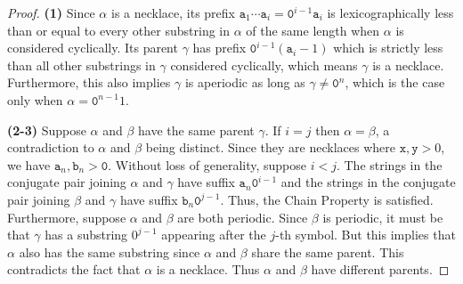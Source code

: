 \documentclass[10pt,a4paper]{amsart}
\renewcommand{\tt} {\mathtt}
\begin{document}
\begin{proof}
{\bf (1)} Since $\alpha$ is a necklace, its prefix $\tt{a}_1\cdots \tt{a}_i = \tt{0}^{i-1}\tt{a}_i$ is lexicographically less than or equal to every other substring in $\alpha$ of the same length when $\alpha$ is considered cyclically. Its parent $\gamma$ has prefix $\tt{0}^{i-1}(\tt{a}_i-1)$
which is strictly less than all other substrings in $\gamma$ considered cyclically, which means $\gamma$ is a necklace. Furthermore, this also implies $\gamma$ is aperiodic as long as $\gamma \neq \tt{0}^n$, which is the case only when $\alpha = \tt{0}^{n-1}1$.

{\bf (2-3)}
Suppose $\alpha$ and $\beta$ have the same parent $\gamma$.  If $i=j$ then $\alpha = \beta$, a contradiction to $\alpha$ and $\beta$ being distinct. Since they are necklaces where $\tt{x},\tt{y} > 0$, we have $\tt{a}_n, \tt{b}_n > \tt{0}$. Without loss of generality, suppose $i < j$.  The strings in the conjugate pair joining $\alpha$ and $\gamma$ have suffix $\tt{a}_n\tt{0}^{i-1}$ and the strings in the conjugate pair joining $\beta$ and $\gamma$ have suffix $\tt{b}_n\tt{0}^{j-1}$.  Thus, the Chain Property is satisfied. Furthermore, suppose $\alpha$ and $\beta$ are both periodic. Since $\beta$ is periodic, it must be that $\gamma$ has a substring $0^{j-1}$ appearing after the $j$-th symbol.  But this implies that $\alpha$ also has the same substring since  $\alpha$ and $\beta$ share the same parent. This contradicts the fact that $\alpha$ is a necklace.
Thus $\alpha$ and $\beta$ have different parents.  
\end{proof}
\end{document}
